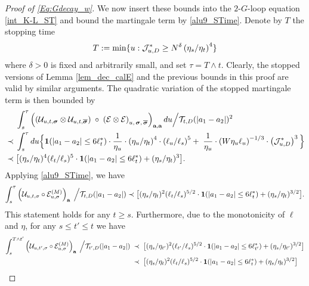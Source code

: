\documentclass[10pt,reqno]{article}
\theoremstyle{plain} %
\theoremstyle{remark}
\numberwithin{equation}{section}
\begin{document}
\begin{proof}[Proof of \eqref{Eq:Gdecay_w}]
We now insert  these bounds   into the $2$-$G$-loop equation \eqref{int_K-L_ST} and 
bound  the martingale term by \eqref{alu9_STime}.
Denote by $T$ the stopping time 
\begin{align}
T:=\min \{u: {\cal J}^*_{u,D} \ge N^{\delta}\left(\eta_s / \eta_t\right)^4\}
\end{align}
where $\delta>0$ is fixed and arbitrarily small, and set $\tau = T \wedge t$. 
Clearly, the stopped versions of Lemma \ref{lem_dec_calE} and the previous bounds in this proof are valid by similar arguments. 
The quadratic variation of the stopped  martingale term is then bounded by 
\begin{align}\label{51}
& \int_s^\tau  \left( \left(\mathcal{U}_{u,t,  \boldsymbol{\sigma}}
   \otimes 
   \mathcal{U}_{u, t,  \overline{\boldsymbol{\sigma}}}
   \right) \;\circ  \;
   \left( \mathcal{E} \otimes  \mathcal{E}  \right)
   _{u, \,\boldsymbol{\sigma},\, \overline{\boldsymbol{\sigma}} }
   \right)_{{\textbf a}, {\textbf a}}  d u
 \Big/{\cal T}_{t, D}(|a_1-a_2|)^2  \nonumber \\
 \;\prec \; &   \int_s^\tau   d u \Big \{ 
 {\bf1}(|a_1-a_2|
\le 6\ell_t^*)\cdot  \frac{1} {\eta_u} \cdot \left(\eta_u / \eta_t\right)^4\cdot \left(\ell_u / \ell_s\right)^5 
+ \;  \frac{1}{\eta_u} 
  \cdot
       \left(W \eta_u \ell_u\right)^{-1/3}  \cdot \left({\cal J}^{*}_{u,D} \right)^{3 }  \Big \}   \nonumber \\
\;\prec \; &    \big [ (\eta_s/\eta_t)^{4}(\ell_t/\ell_s)^{5}  \cdot {\bf 1}(|a_1-a_2|\le 6\ell_t^*)+(\eta_s/\eta_t)^{3} \big ].
 \end{align}
Applying  \eqref{alu9_STime}, we have 
 $$
 \int_s^\tau\left(\mathcal{U}_{u, t, \sigma} \circ \mathcal{E}_{u, \sigma}^{(M)}\right)_{\textbf{a}}\;\Big/{\cal T}_{t, D}(|a_1-a_2|)
 \prec \big [ (\eta_s/\eta_t)^{2}(\ell_t/\ell_s)^{5/2}  \cdot {\bf 1}(|a_1-a_2|\le 6\ell_t^*)+(\eta_s/\eta_t)^{3/2} \big ].
 $$
 This statement holds for any $t\ge s$. Furthermore, due to the monotonicity of $\ell$ and $\eta$, for any $s\le t'\le t$ we have
\begin{align}\label{bsluwous1}
  \int_s^{T\wedge t'}\left(\mathcal{U}_{u,t', \sigma} \circ \mathcal{E}_{u, \sigma}^{(M)}\right)_{\textbf{a}}\;\Big/{\cal T}_{t', D}(|a_1-a_2|)
   & \; \prec \; \big [ (\eta_s/\eta_{t'})^{2}(\ell_{t'}/\ell_s)^{5/2}  \cdot {\bf 1}(|a_1-a_2|\le 6\ell_{t'}^*)+(\eta_s/\eta_{t'})^{3/2} \big ]
 \\\nonumber
  & \; \prec \;  \big [ (\eta_s/\eta_{t })^{2}(\ell_{t }/\ell_s)^{5/2}  \cdot {\bf 1}(|a_1-a_2|\le 6\ell_{t }^*)+(\eta_s/\eta_{t })^{3/2} \big ]

\end{align}
\end{proof}
\end{document}
